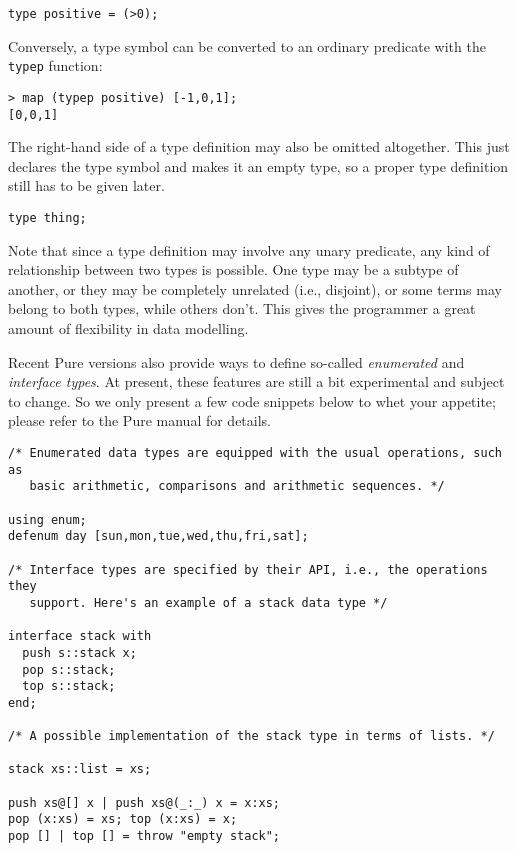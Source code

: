 \documentclass[a4paper,12pt]{article}
\begin{document}
\begin{lstlisting}
type positive = (>0);
\end{lstlisting}

Conversely, a type symbol can be converted to an ordinary predicate with the \verb|typep| function:

\begin{lstlisting}
> map (typep positive) [-1,0,1];
[0,0,1]
\end{lstlisting}

The right-hand side of a type definition may also be omitted altogether. This just declares the type symbol and makes it an empty type, so a proper type definition still has to be given later.

\begin{lstlisting}
type thing;
\end{lstlisting}

Note that since a type definition may involve any unary predicate, any kind of relationship between two types is possible. One type may be a subtype of another, or they may be completely unrelated (i.e., disjoint), or some terms may belong to both types, while others don't. This gives the programmer a great amount of flexibility in data modelling.

Recent Pure versions also provide ways to define so-called \emph{enumerated} and \emph{interface types}. At present, these features are still a bit experimental and subject to change. So we only present a few code snippets below to whet your appetite; please refer to the Pure manual for details.

\begin{lstlisting}
/* Enumerated data types are equipped with the usual operations, such as
   basic arithmetic, comparisons and arithmetic sequences. */

using enum;
defenum day [sun,mon,tue,wed,thu,fri,sat];

/* Interface types are specified by their API, i.e., the operations they
   support. Here's an example of a stack data type */

interface stack with
  push s::stack x;
  pop s::stack;
  top s::stack;
end;

/* A possible implementation of the stack type in terms of lists. */

stack xs::list = xs;

push xs@[] x | push xs@(_:_) x = x:xs;
pop (x:xs) = xs; top (x:xs) = x;
pop [] | top [] = throw "empty stack";
\end{lstlisting}
\end{document}
